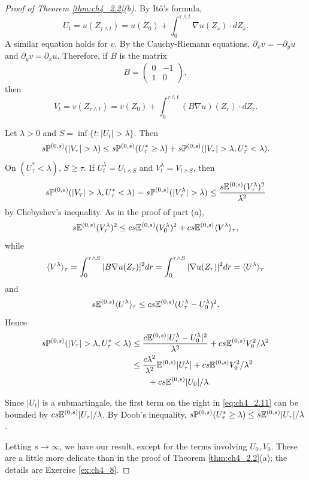 \begin{proof}[Proof of Theorem \ref{thm:ch4_2.2}(b)]
By It\^o's formula,
\[
    U_t = u(Z_{\tau\wedge t}) = u(Z_0) + \int_0^{\tau\wedge t} \nabla u(Z_s) \cdot dZ_s.
\]
A similar equation holds for $v$. By the Cauchy-Riemann equations, $\partial_x v = -\partial_y u$ and $\partial_y v = \partial_x u$. Therefore, if $B$ is the matrix
\begin{equation}\label{eq:ch4_2.10}
    B = \begin{pmatrix} 0 & -1 \\ 1 & 0 \end{pmatrix},
\end{equation}
then
\[
    V_t = v(Z_{\tau\wedge t}) = v(Z_0) + \int_0^{\tau\wedge t} (B\nabla u)(Z_r) \cdot dZ_r.
\]

Let $\lambda > 0$ and $S = \inf\{t : |U_t| > \lambda\}$. Then
\[
    s\P^{(0,s)}(|V_\tau| > \lambda) \leq s\P^{(0,s)}(U_\tau^* \geq \lambda) + s\P^{(0,s)}(|V_\tau| > \lambda, U_\tau^* < \lambda).
\]
On $(U_\tau^* < \lambda)$, $S \geq \tau$. If $U_t^\lambda = U_{t\wedge S}$ and $V_t^\lambda = V_{t\wedge S}$, then
\[
    s\P^{(0,s)}(|V_\tau| > \lambda, U_\tau^* < \lambda) = s\P^{(0,s)}(|V_\tau^\lambda| > \lambda) \leq \frac{s\E^{(0,s)}(V_\tau^\lambda)^2}{\lambda^2}
\]
by Chebyshev's inequality. As in the proof of part (a),
\[
    s\E^{(0,s)}(V_\tau^\lambda)^2 \leq cs\E^{(0,s)}(V_0^\lambda)^2 + cs\E^{(0,s)}\lrang{V^\lambda}_\tau,
\]
while
\[
    \lrang{V^\lambda}_\tau = \int_0^{\tau\wedge S} |B\nabla u(Z_r)|^2dr = \int_0^{\tau\wedge S} |\nabla u(Z_r)|^2dr = \lrang{U^\lambda}_\tau
\]
and
\[
    s\E^{(0,s)}\lrang{U^\lambda}_\tau \leq cs\E^{(0,s)}(U_\tau^\lambda - U_0^\lambda)^2.
\]
Hence
\begin{align}\label{eq:ch4_2.11}
    s\P^{(0,s)}(|V_\tau| > \lambda, U_\tau^* < \lambda) &\leq \frac{c\E^{(0,s)}|U_\tau^\lambda - U_0^\lambda|^2}{\lambda^2} + cs\E^{(0,s)}V_0^2/\lambda^2 \\
    &\leq \frac{c\lambda^2}{\lambda^2}\E^{(0,s)}|U_\tau^\lambda| + cs\E^{(0,s)}V_0^2/\lambda^2 \notag \\
    &\qquad+ cs\E^{(0,s)}|U_0|/\lambda. \notag
\end{align}

Since $|U_t|$ is a submartingale, the first term on the right in \eqref{eq:ch4_2.11} can be bounded by $cs\E^{(0,s)}|U_\tau|/\lambda$. By Doob's inequality, $s\P^{(0,s)}(U_\tau^* \geq \lambda) \leq s\E^{(0,s)}|U_\tau|/\lambda$.

Letting $s \to \infty$, we have our result, except for the terms involving $U_0,V_0$. These are a little more delicate than in the proof of Theorem \ref{thm:ch4_2.2}(a); the details are Exercise \ref{ex:ch4_8}.
\end{proof}

